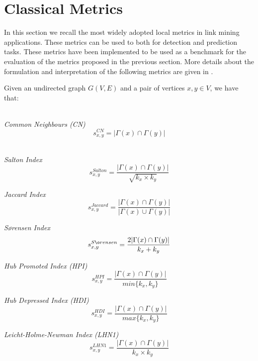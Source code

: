 \section{Classical Metrics}
\label{sec:metrics}
In this section we recall the most widely adopted local metrics in link mining applications. These metrics can be used to both for detection and prediction tasks.
These metrics have been implemented to be used as a benchmark for the evaluation of the metrics proposed in the previous section.
More details about the formulation and interpretation of the following metrics are given in \cite{Lu2011}.

Given an undirected graph $G(V,E)$ and a pair of vertices $x,y\in V$, we have that:

\noindent\\
\textit{Common Neighbours (CN)}
\begin{equation}
\label{eqn:common-neighbours}
s^{CN}_{x,y}= |\Gamma(x) \cap \Gamma(y)|
\end{equation}

\noindent\\
\textit{Salton Index}
\begin{equation}
\label{eqn:salton}
s^{Salton}_{x,y}=
\frac{ |\Gamma(x) \cap \Gamma(y)|}{\sqrt{k_{x} \times k_{y}}}
\end{equation}

\noindent
\textit{Jaccard Index}
\begin{equation}
\label{eqn:jaccard}
s^{Jaccard}_{x,y}=
\frac{|\Gamma(x) \cap \Gamma(y)|}{|\Gamma(x) \cup \Gamma(y)|}
\end{equation}

\noindent
\textit{S\o rensen Index}
\begin{equation}
\label{eqn:sorensen}
s^{S\o rensen}_{x,y}=
\frac{2|\Gamma(x) \cap \Gamma(y)|}{k_{x} + k_{y}}
\end{equation}

\noindent
\textit{Hub Promoted Index (HPI)}
\begin{equation}
\label{eqn:hpi}
s^{HPI}_{x,y}=
\frac{|\Gamma(x) \cap \Gamma(y)|}{min\{k_{x},k_{y}\}}
\end{equation}

\noindent
\textit{Hub Depressed Index (HDI)}
\begin{equation}
\label{eqn:hdi}
s^{HDI}_{x,y}=
\frac{|\Gamma(x) \cap \Gamma(y)|}{max\{k_{x},k_{y}\}}
\end{equation}

\noindent
\textit{Leicht-Holme-Newman Index (LHN1)}
\begin{equation}
\label{eqn:lhn1}
s^{LHN1}_{x,y}=
\frac{|\Gamma(x) \cap \Gamma(y)|}{k_{x} \times k_{y}}
\end{equation}

